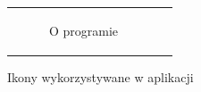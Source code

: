 \documentclass[a4paper,12pt]{article}
\begin{document}
\begin{figure}[!htb]
\begin{tabular}{cc}
\begin{subfigure}[b]{0.2\textwidth}
            \caption{O programie}
            \label{icons:about} 
       \end{subfigure} &  \\              
\end{tabular}  		
\caption{Ikony wykorzystywane w aplikacji} 	
\label{icons}
\end{figure}
\end{document}
